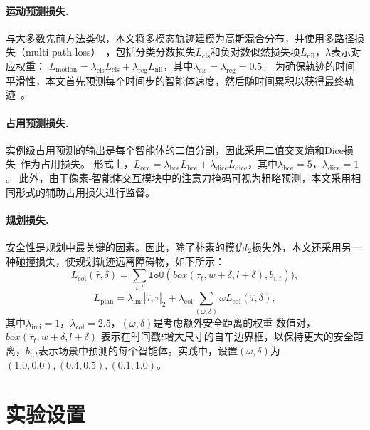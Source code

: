 \documentclass[10pt,twocolumn,letterpaper]{article}
\begin{document}
\paragraph{运动预测损失.} 与大多数先前方法类似，本文将多模态轨迹建模为高斯混合分布，并使用多路径损失（multi-path loss）~\cite{chai2020multipath, varadarajan2021multipath++}，包括分类分数损失$L_{\text{cls}}$和负对数似然损失项$L_{\text{nll}}$，$\lambda$表示对应权重：
%
$L_{\text{motion}} = \lambda_{\text{cls}} L_{\text{cls}} + \lambda_{\text{reg}} L_{\text{nll}}$，其中$\lambda_{\text{cls}}\!\!=\!\!\lambda_{\text{reg}}\!\!=\!\!0.5$。
%
为确保轨迹的时间平滑性，本文首先预测每个时间步的智能体速度，然后随时间累积以获得最终轨迹~\cite{jia2022temporal}。

\paragraph{占用预测损失.} 实例级占用预测的输出是每个智能体的二值分割，因此采用二值交叉熵和Dice损失~\cite{milletari2016dice}作为占用损失。
%
形式上，$L_{\text{occ}} = \lambda_{\text{bce}} L_{\text{bce}} + \lambda_{\text{dice}} L_{\text{dice}}$，其中$\lambda_{\text{bce}}\!=\!5$，$\lambda_{\text{dice}}\!=\!1$。
%
此外，由于像素-智能体交互模块中的注意力掩码可视为粗略预测，本文采用相同形式的辅助占用损失进行监督。


\paragraph{规划损失.} 安全性是规划中最关键的因素。因此，除了朴素的模仿$l_2$损失外，本文还采用另一种碰撞损失，使规划轨迹远离障碍物，如下所示：
\begin{equation}
\label{eq:col-iouloss}
    L_{\text{col}}(\hat{\tau}, \delta) = \sum_{i, t} \texttt{IoU}(box(\hat{\tau}_{t}, w+\delta, l+\delta), b_{i, t})),
\end{equation}
%
\begin{equation}
\label{eq:plan-loss}
    L_{\text{plan}} = \lambda_{\text{imi}} |\hat{\tau}, \tilde{\tau}|_2 + \lambda_{\text{col}} \sum_{(\omega,\delta) } \omega  L_{\text{col}}(\hat{\tau}, \delta),
\end{equation}
其中$\lambda_{\text{imi}}\!=\!1$，$\lambda_{\text{col}}\!=\!2.5$，$(\omega,\delta)$是考虑额外安全距离的权重-数值对，$box(\hat{\tau}_{t}, w\!+\!\delta, l\!+\!\delta)$
表示在时间戳$t$增大尺寸的自车边界框，以保持更大的安全距离，$b_{i,t}$表示场景中预测的每个智能体。实践中，设置$(\omega,\delta)$为$(1.0, 0.0), (0.4, 0.5), (0.1, 1.0)$。


\section{实验设置}
\label{sec:exp}
\end{document}
